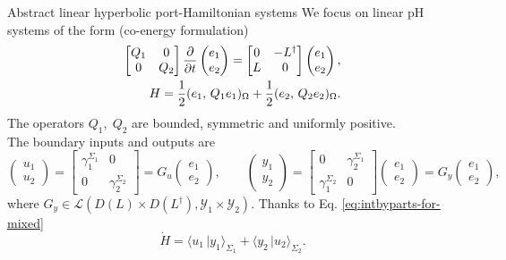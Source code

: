 \documentclass[aspectratio=169]{beamer}
\newcommand{\inner}[3][]{\ensuremath{( #2, \, #3 )_{#1}}}
\newcommand{\dualpr}[3][]{\ensuremath{\langle #2 \, \vert #3 \rangle_{#1}}}
\begin{document}
\begin{frame}{Abstract linear hyperbolic port-Hamiltonian systems}
	We focus on linear pH systems of the form (co-energy formulation)
\begin{equation*}
	\begin{aligned}
		\begin{bmatrix}
			Q_1 & 0 \\
			0 & Q_2
		\end{bmatrix}\diffp{}{t}\begin{pmatrix}
			e_1 \\ e_2
		\end{pmatrix} = 
		\begin{bmatrix}
			0 & -L^\dag \\
			L & 0 \\
		\end{bmatrix}\begin{pmatrix}
			e_1 \\ e_2
		\end{pmatrix}, \\
		H = \frac{1}{2}\inner[\Omega]{e_1}{Q_1 e_1} + \frac{1}{2}\inner[\Omega]{e_2}{Q_2 e_2}.
	\end{aligned}
\end{equation*}
The operators $Q_1, \; Q_2$ are bounded, symmetric and uniformly positive. \\
The boundary inputs and outputs are
\begin{equation*}
	\begin{pmatrix}
		u_1 \\ u_2
	\end{pmatrix} = \begin{bmatrix}
	\gamma_1^{\Sigma_1} & 0 \\
	0 & \gamma_2^{\Sigma_2}
\end{bmatrix} = G_u
	\begin{pmatrix}
		e_1 \\ e_2
	\end{pmatrix}, \qquad 	\begin{pmatrix}
	y_1 \\ y_2
\end{pmatrix} = 
\begin{bmatrix}
0 & \gamma_2^{\Sigma_1} \\
\gamma_1^{\Sigma_2} & 0
\end{bmatrix} 
\begin{pmatrix}
e_1 \\ e_2
\end{pmatrix} = G_y
\begin{pmatrix}
e_1 \\ e_2
\end{pmatrix},
\end{equation*}
where $G_y \in \mathcal{L}(D(L) \times D(L^\dag), \mathcal{Y}_1 \times \mathcal{Y}_2)$. Thanks to Eq. \eqref{eq:intbyparts-for-mixed}
\begin{equation*}
	\dot{H} = \dualpr[\Sigma_1]{u_1}{y_1} + \dualpr[\Sigma_2]{y_2}{u_2}.
\end{equation*}
\end{frame}
\end{document}
